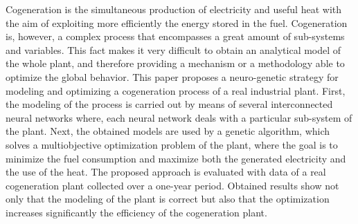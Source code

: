 Cogeneration is the simultaneous production of electricity and useful heat with the aim of exploiting more efficiently the energy stored in the fuel. Cogeneration is, however, a complex process that encompasses a great amount of sub-systems and variables. This fact makes it very difficult to obtain an analytical model of the whole plant, and therefore providing a mechanism or a methodology able to optimize the global behavior. This paper proposes a neuro-genetic strategy for modeling and optimizing a cogeneration process of a real industrial plant. First, the modeling of the process is carried out by means of several interconnected neural networks where, each neural network deals with a particular sub-system of the plant. Next, the obtained models are used by a genetic algorithm, which solves a multiobjective optimization problem of the plant, where the goal is to minimize the fuel consumption and maximize both the generated electricity and the use of the heat. The proposed approach is evaluated with data of a real cogeneration plant collected over a one-year period. Obtained results show not only that the modeling of the plant is correct but also that the optimization increases significantly the efficiency of the cogeneration plant.
